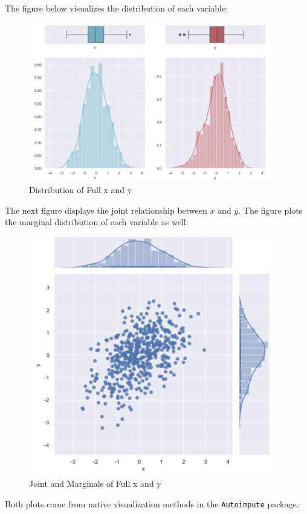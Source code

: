 \documentclass[12pt,oneside]{chicagocapstone}
\begin{document}
The figure below visualizes the distribution of each variable:
\begin{figure}

{\centering \includegraphics[width=400px]{figure/full-side-by-side} 

}

\caption{Distribution of Full x and y}\label{fig:fullsidebyside}
\end{figure}
The next figure displays the joint relationship between \(x\) and \(y\).
The figure plots the marginal distribution of each variable as well:
\begin{figure}

{\centering \includegraphics[width=400px]{figure/full-joint} 

}

\caption{Joint and Marginals of Full x and y}\label{fig:full-joint}
\end{figure}
Both plots come from native visualization methods in the
\texttt{Autoimpute} package.
\end{document}
